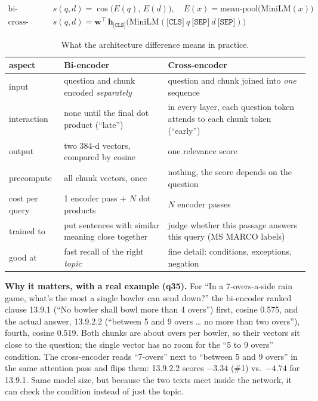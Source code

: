 \documentclass[10pt,a4paper]{article}
\begin{document}
\begin{align*}
\text{bi-encoder: } & s(q,d) = \cos\big(E(q),\,E(d)\big), \quad E(x) = \text{mean-pool}\big(\text{MiniLM}(x)\big) \\
\text{cross-encoder: } & s(q,d) = \mathbf{w}^\top\, \mathbf{h}_{\texttt{[CLS]}}\big(\text{MiniLM}(\texttt{[CLS]}\ q\ \texttt{[SEP]}\ d\ \texttt{[SEP]})\big)
\end{align*}

\begin{table}[htbp]
\centering\small
\begin{tabularx}{\linewidth}{@{}L{2.7cm}YY@{}}
\toprule
\textbf{aspect} & \textbf{Bi-encoder} & \textbf{Cross-encoder} \\
\midrule
input & question and chunk encoded \emph{separately} & question and chunk joined into \emph{one} sequence \\
interaction & none until the final dot product (``late'') & in every layer, each question token attends to each chunk token (``early'') \\
output & two 384-d vectors, compared by cosine & one relevance score \\
precompute & all chunk vectors, once & nothing, the score depends on the question \\
cost per query & 1 encoder pass + $N$ dot products & $N$ encoder passes \\
trained to & put sentences with similar meaning close together & judge whether this passage answers this query (MS MARCO labels) \\
good at & fast recall of the right \emph{topic} & fine detail: conditions, exceptions, negation \\
\bottomrule
\end{tabularx}
\caption{What the architecture difference means in practice.}
\label{tab:arch}
\end{table}

\textbf{Why it matters, with a real example (q35).} For ``In a 7-overs-a-side rain game, what's the most a single bowler can send down?'' the bi-encoder ranked clause 13.9.1 (``No bowler shall bowl more than 4 overs'') first, cosine 0.575, and the actual answer, 13.9.2.2 (``between 5 and 9 overs \ldots{} no more than two overs''), fourth, cosine 0.519. Both chunks are about overs per bowler, so their vectors sit close to the question; the single vector has no room for the ``5 to 9 overs'' condition. The cross-encoder reads ``7-overs'' next to ``between 5 and 9 overs'' in the same attention pass and flips them: 13.9.2.2 scores $-3.34$ (\#1) vs.\ $-4.74$ for 13.9.1. Same model size, but because the two texts meet inside the network, it can check the condition instead of just the topic.
\end{document}
